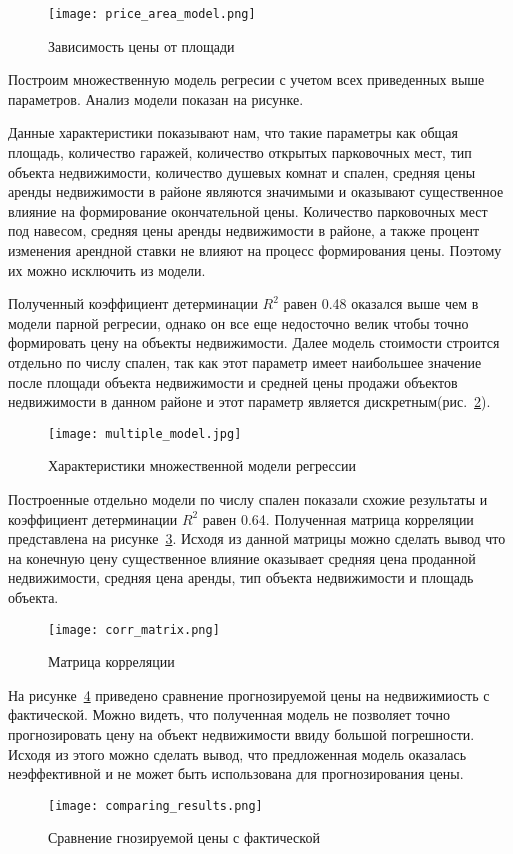 \begin{figure}[!ht]
  \centering
  \texttt{[image: price\_area\_model.png]} 
  \caption{Зависимость цены от площади}
  \label{fig:experiment:price_area_model}
\end{figure}

Построим множественную модель регресии с учетом всех приведенных выше параметров. Анализ модели показан на
рисунке.

Данные характеристики показывают нам, что такие параметры как 
общая площадь, количество гаражей, количество открытых парковочных мест, тип объекта недвижимости, количество душевых комнат и спален,
средняя цены аренды недвижимости в районе являются значимыми и оказывают существенное влияние на формирование
окончательной цены. Количество парковочных мест под навесом, средняя цены аренды недвижимости в районе,
а также процент изменения арендной ставки не влияют на процесс формирования цены. Поэтому их можно исключить из модели.

Полученный коэффициент детерминации $R^2$ равен 0.48 оказался выше чем в модели парной регресии, однако он все еще
недосточно велик чтобы точно формировать цену на объекты недвижимости. Далее модель стоимости строится
отдельно по числу спален, так как этот параметр имеет наибольшее значение после площади объекта недвижимости
и средней цены продажи объектов недвижимости в данном районе и этот параметр
является дискретным(рис.~\ref{fig:experiment:multiple_model}).

\begin{figure}[!ht]
  \centering
  \texttt{[image: multiple\_model.jpg]}
  \caption{Характеристики множественной модели регрессии}
  \label{fig:experiment:multiple_model}
\end{figure}

Построенные отдельно модели по числу спален показали схожие результаты и коэффициент детерминации $R^2$ равен 0.64.
Полученная матрица корреляции представлена на рисунке~\ref{fig:experiment:corr_matrix}. Исходя из данной матрицы можно 
сделать вывод что на конечную цену существенное влияние оказывает средняя цена проданной недвижимости, средняя цена аренды,
тип объекта недвижимости и площадь объекта.

\begin{figure}[!ht]
  \centering
  \texttt{[image: corr\_matrix.png]}
  \caption{Матрица корреляции}
  \label{fig:experiment:corr_matrix}
\end{figure}

На рисунке~\ref{fig:experiment:comparing_results} приведено сравнение прогнозируемой цены на недвижимиость
с фактической. Можно видеть, что полученная модель не позволяет точно прогнозировать цену на объект недвижимости ввиду
большой погрешности. Исходя из этого можно сделать вывод, что предложенная модель оказалась неэффективной и не может быть
использована для прогнозирования цены.

\begin{figure}[!ht]
  \centering
  \texttt{[image: comparing\_results.png]}
  \caption{Сравнение гнозируемой цены с фактической}
  \label{fig:experiment:comparing_results}
\end{figure}
